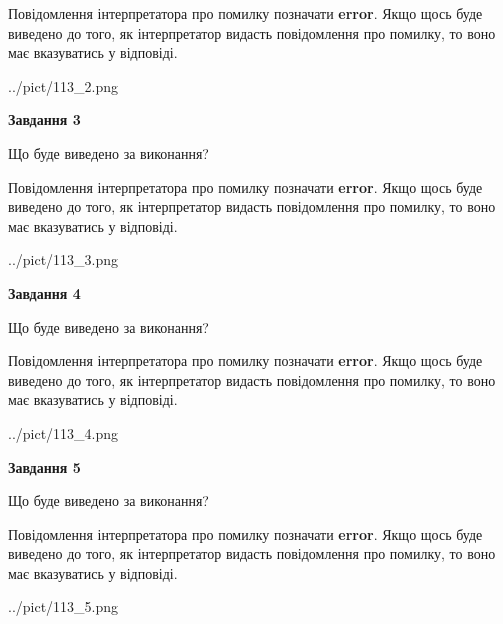 \documentclass[12pt, ukrainian]{article}
\begin{document}
{\begin {large}
Повідомлення інтерпретатора про помилку позначати \textbf{error}.
Якщо щось буде виведено до того, як інтерпретатор видасть повідомлення про помилку, 
то воно має вказуватись у відповіді. \par


\begin{center}
	{../pict/113_2.png}
\end{center}
\newpage

{\begin {center}\textbf{Завдання 3}\end {center}}\par
Що буде виведено за виконання?

Повідомлення інтерпретатора про помилку позначати \textbf{error}.
Якщо щось буде виведено до того, як інтерпретатор видасть повідомлення про помилку, 
то воно має вказуватись у відповіді. \par


\begin{center}
	{../pict/113_3.png}
\end{center}
\newpage

{\begin {center}\textbf{Завдання 4}\end {center}}\par
Що буде виведено за виконання?

Повідомлення інтерпретатора про помилку позначати \textbf{error}.
Якщо щось буде виведено до того, як інтерпретатор видасть повідомлення про помилку, 
то воно має вказуватись у відповіді. \par


\begin{center}
	{../pict/113_4.png}
\end{center}
\newpage

{\begin {center}\textbf{Завдання 5}\end {center}}\par
Що буде виведено за виконання?

Повідомлення інтерпретатора про помилку позначати \textbf{error}.
Якщо щось буде виведено до того, як інтерпретатор видасть повідомлення про помилку, 
то воно має вказуватись у відповіді. \par


\begin{center}
	{../pict/113_5.png}
\end{center}
\newpage


\end{large}}
\end{document}
